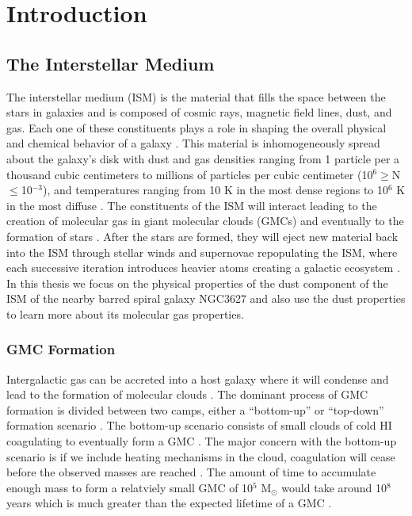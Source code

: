 \chapter{Introduction}\label{intro}

\section{The Interstellar Medium} 

The interstellar medium (ISM) is the material that fills the space between the stars in galaxies and is composed of cosmic rays, magnetic field lines, dust, and gas.  Each one of these constituents plays a role in shaping the overall physical and chemical behavior of a galaxy \citep{ferriere2001}.  This material is inhomogeneously spread about the galaxy's disk with dust and gas densities ranging from 1 particle per a thousand cubic centimeters to millions of particles per cubic centimeter (10$^{6}\geq$N$\leq$10$^{-3}$), and temperatures ranging from 10 K in the most dense regions to 10$^6$ K in the most diffuse \citep{ferriere2001}.  The constituents of the ISM will interact leading to the creation of molecular gas in giant molecular clouds (GMCs) and eventually to the formation of stars \citep{field1965}.  After the stars are formed, they will eject new material back into the ISM through stellar winds and supernovae repopulating the ISM, where each successive iteration introduces heavier atoms creating a galactic ecosystem \citep{ferriere2001}.  In this thesis we focus on the physical properties of the dust component of the ISM of the nearby barred spiral galaxy NGC3627 and also use the dust properties to learn more about its molecular gas properties.

\subsection{GMC Formation}

Intergalactic gas can be accreted into a host galaxy where it will condense and lead to the formation of molecular clouds \citep{kennicutt2012}.  The dominant process of GMC formation is divided between two camps, either a ``bottom-up'' or ``top-down'' formation scenario \citep{mckee2007}.  The bottom-up scenario consists of small clouds of cold HI coagulating to eventually form a GMC \citep{field1965, kwan1979}.  The major concern with the bottom-up scenario is if we include heating mechanisms in the cloud, coagulation will cease before the observed masses are reached \citep{mckee2007}.  The amount of time to accumulate enough mass to form a relatviely small GMC of 10$^5$ M$_\odot$ would take around 10$^8$ years which is much greater than the expected lifetime of a GMC \citep{kwan1979}.

